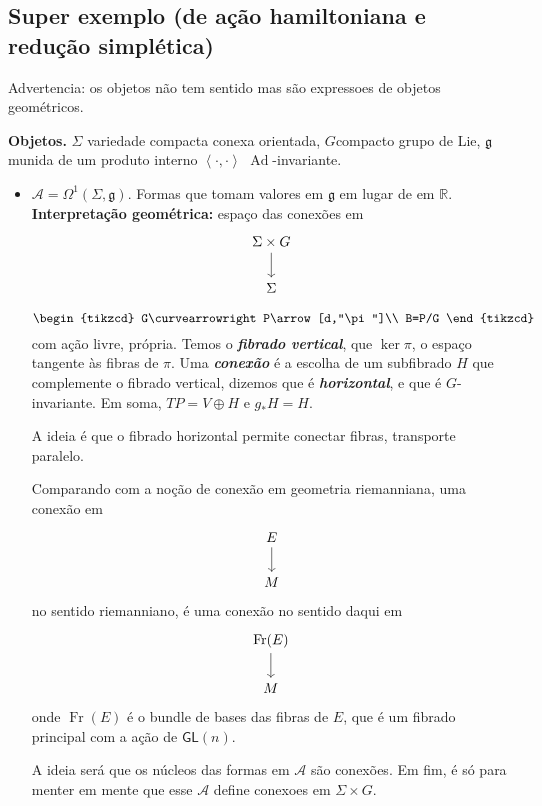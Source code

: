 \subsection{Super exemplo (de ação hamiltoniana e redução simplética)}

Advertencia: os objetos não tem sentido mas são expressoes de objetos geométricos.

{\color{5}\bfseries Objetos.}\hspace{.5em} $\Sigma$ variedade compacta conexa orientada, $G$compacto grupo de Lie, $\mathfrak{g}$ munida de um produto interno $\left<\cdot,\cdot\right> $ $\operatorname{Ad}$-invariante.
\begin{itemize}
\item $\mathcal{A}=\Omega^{1}(\Sigma,\mathfrak{g})$. Formas que tomam valores em $\mathfrak{g}$ em lugar de em $\mathbb{R}$. \textbf{Interpretação geométrica:}  espaço das conexões em 
	\[\begin{tikzcd}
	\Sigma\times G\arrow[d]\\
	\Sigma
	\end{tikzcd}\]
	\begin{remark}[Conexões]\leavevmode
		\[\begin{tikzcd}
		G\curvearrowright P\arrow[d,"\pi"]\\
		B=P/G
		\end{tikzcd}\]
		com ação livre, própria. Temos o \textit{\textbf{fibrado vertical}}, que  $\ker \pi$, o espaço tangente às fibras de $\pi$. Uma \textit{\textbf{conexão}} é a escolha de um subfibrado $H$ que complemente o fibrado vertical, dizemos que é \textit{\textbf{horizontal}}, e que  é $G$-invariante. Em soma, $TP=V\oplus H$ e $g_* H=H$.

		A ideia é que o fibrado horizontal permite conectar fibras, transporte paralelo.

		Comparando com a noção de conexão em geometria riemanniana, uma conexão em
		\[\begin{tikzcd}
		E\arrow[d]\\
		M
		\end{tikzcd}\]no sentido riemanniano, é uma conexão no sentido daqui em
		\[\begin{tikzcd}
		\operatorname{Fr}(E)\arrow[d]\\
		M
		\end{tikzcd}\]onde $\operatorname{Fr}(E)$ é o bundle de bases das fibras de $E$, que é um fibrado principal com a ação de $\mathsf{GL}(n)$.
	\end{remark}
	A ideia será que os núcleos das formas em $\mathcal{A}$ são conexões. Em fim, é só para menter em mente que esse $\mathcal{A}$ define conexoes em $\Sigma\times G$.


\end{itemize}
